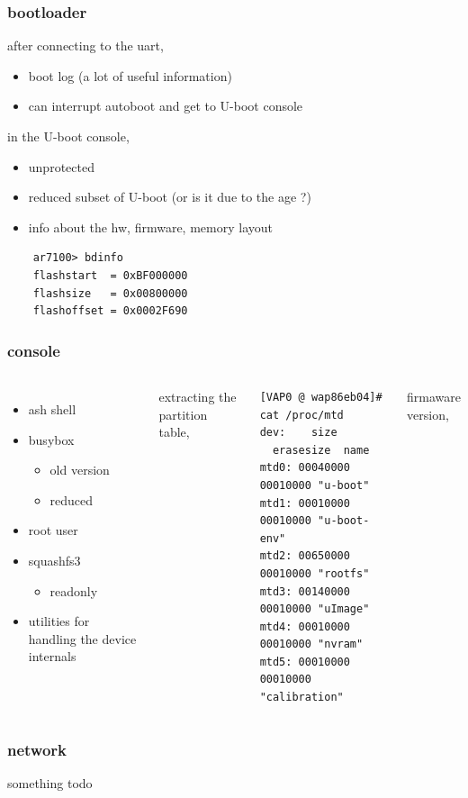 \documentclass{beamer}
\begin{document}
\begin{frame}[fragile]
	\frametitle{bootloader}	
	after connecting to the uart,
	\begin{itemize}
		\item boot log (a lot of useful information)
		\item can interrupt autoboot and get to U-boot console
	\end{itemize}
	in the U-boot console,
	\begin{itemize}
		\item unprotected
		\item reduced subset of U-boot (or is it due to the age ?)
		\item info about the hw, firmware, \alert{memory layout}
	\end{itemize}
	\begin{verbatim}
	ar7100> bdinfo
	flashstart  = 0xBF000000
	flashsize   = 0x00800000
	flashoffset = 0x0002F690
	\end{verbatim}
\end{frame}

\begin{frame}[fragile]
	\frametitle{console}
	\begin{columns}
		\begin{itemize}
			\item ash shell
			\item busybox
				\begin{itemize}
					\item old version
					\item reduced
				\end{itemize}
			\item root user
			\item squashfs3
				\begin{itemize}
					\item readonly	
				\end{itemize}
			\item utilities for handling the device internals

		\end{itemize}
		extracting the partition table,
		\begin{verbatim}
[VAP0 @ wap86eb04]# cat /proc/mtd    
dev:    size   erasesize  name  
mtd0: 00040000 00010000 "u-boot"  
mtd1: 00010000 00010000 "u-boot-env"  
mtd2: 00650000 00010000 "rootfs"  
mtd3: 00140000 00010000 "uImage"  
mtd4: 00010000 00010000 "nvram"  
mtd5: 00010000 00010000 "calibration"	
		\end{verbatim}
		firmaware version,
	\end{columns}
\end{frame}

\begin{frame}
	\frametitle{network}
	something todo	
\end{frame}
\end{document}
